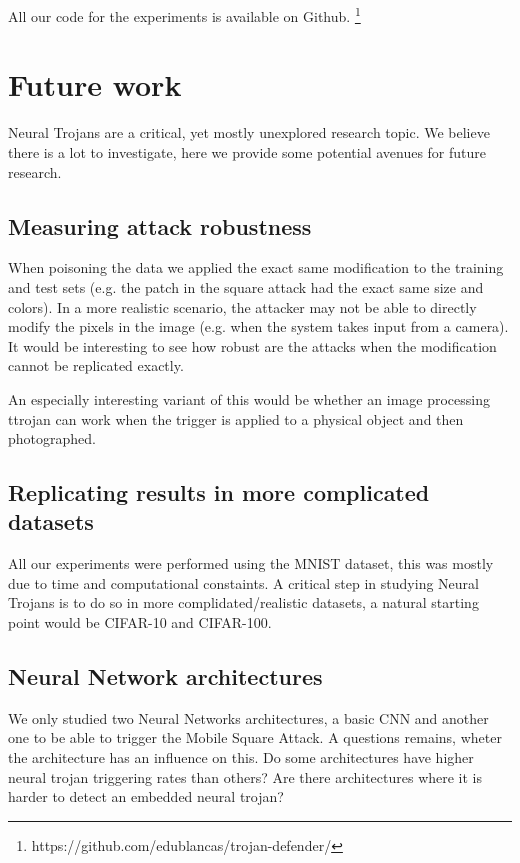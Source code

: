 \documentclass[letterpaper, 10 pt, conference]{ieeeconf}  %
\begin{document}
All our code for the experiments is available on Github. \footnote{https://github.com/edublancas/trojan-defender/}

\section{Future work}

Neural Trojans are a critical, yet mostly unexplored research topic. We believe
there is a lot to investigate, here we provide some potential avenues for
future research.

\subsection{Measuring attack robustness}

When poisoning the data we applied the exact same modification to the training
and test sets (e.g. the patch in the square attack had the exact same size and
colors). In a more realistic scenario, the attacker may not be able to directly
modify the pixels in the image (e.g. when the system takes input from a
camera). It would be interesting to see how robust are the attacks when the
modification cannot be replicated exactly.

An especially interesting variant of this would be whether an image
processing ttrojan can work when the trigger is applied to a physical
object and then photographed.

\subsection{Replicating results in more complicated datasets}

All our experiments were performed using the MNIST dataset, this was mostly due
to time and computational constaints. A critical step in studying Neural
Trojans is to do so in more complidated/realistic datasets, a natural starting
point would be CIFAR-10 and CIFAR-100.

\subsection{Neural Network architectures}

We only studied two Neural Networks architectures, a basic CNN and another one
to be able to trigger the Mobile Square Attack. A questions remains, wheter
the architecture has an influence on this. Do some architectures have higher
neural trojan triggering rates than others? Are there architectures where it
is harder to detect an embedded neural trojan?
\end{document}
